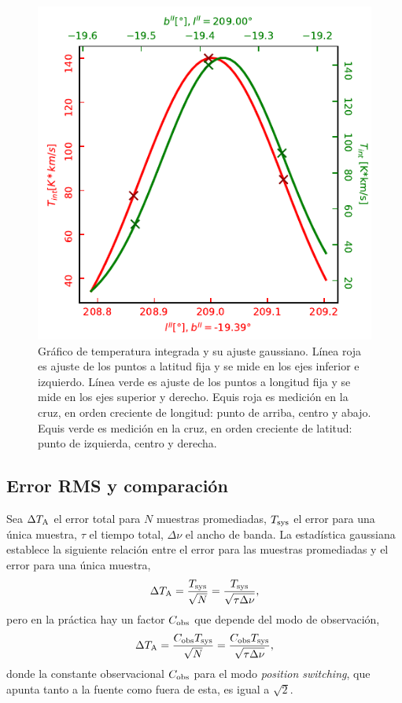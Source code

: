 \begin{figure}[p]
	\centering
	\includegraphics{rsc/tint.pdf}
	\caption{Gráfico de temperatura integrada y su ajuste gaussiano. Línea roja es ajuste de los puntos a latitud fija y se mide en los ejes inferior e izquierdo. Línea verde es ajuste de los puntos a longitud fija y se mide en los ejes superior y derecho. Equis roja es medición en la cruz, en orden creciente de longitud: punto de arriba, centro y abajo. Equis verde es medición en la cruz, en orden creciente de latitud: punto de izquierda, centro y derecha.}
	\label{fig:tint}
\end{figure}

\subsection{Error RMS y comparación}

Sea $\Delta T_\textnormal{A}$ el error total para $N$ muestras promediadas, $T_\textnormal{sys}$ el error para una única muestra, $\tau$ el tiempo total, $\Delta\nu$ el ancho de banda. La estadística gaussiana establece la siguiente relación entre el error para las muestras promediadas y el error para una única muestra,
\begin{equation}
\Delta T_\textnormal{A}=\frac{T_\textnormal{sys}}{\sqrt{N}}=\frac{T_\textnormal{sys}}{\sqrt{\tau\Delta\nu}}\label{eq:rms1}
,\end{equation}
pero en la práctica hay un factor $C_\textnormal{obs}$ que depende del modo de observación,
\begin{equation}
\Delta T_\textnormal{A}=\frac{C_\textnormal{obs}T_\textnormal{sys}}{\sqrt{N}}=\frac{C_\textnormal{obs}T_\textnormal{sys}}{\sqrt{\tau\Delta\nu}}\label{eq:rms2}
,\end{equation}
donde la constante observacional $C_\textnormal{obs}$ para el modo \textit{position switching}, que apunta tanto a la fuente como fuera de esta, es igual a $\sqrt{2}$.

